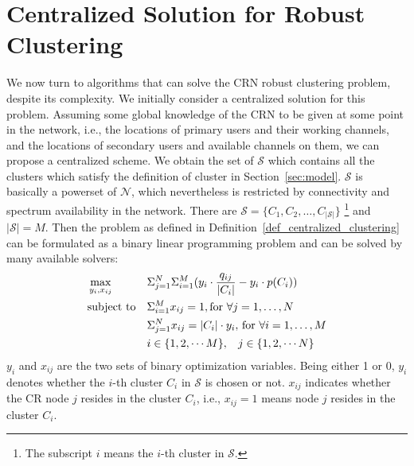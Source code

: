 \documentclass[times]{ettauth}
\newcommand{\ie}{i.e., }
\theoremstyle{mytheoremstyle}
\theoremstyle{mytheoremstyle}
\theoremstyle{mytheoremstyle}
\begin{document}
\section{Centralized Solution for Robust Clustering}
\label{centralized_solution}
We now turn to algorithms that can solve the CRN robust clustering problem, despite its complexity. 
We initially consider a centralized solution for this problem.
Assuming some global knowledge of the CRN to be given at some point in the network, \ie the locations of primary users and their working channels, and the locations of secondary users and available channels on them, we can propose a centralized scheme.
We obtain the set of $\mathcal{S}$ which contains all the clusters which satisfy the definition of cluster in Section~\ref{sec:model}.
$\mathcal{S}$ is basically a powerset of $\mathcal{N}$, which nevertheless is restricted by connectivity and spectrum availability in the network.
There are $\mathcal{S}=\{C_1, C_2, \ldots, C_{|\mathcal{S}|}\}$ \footnote{The subscript $i$ means the $i$-th cluster in $\mathcal{S}$.} and $|\mathcal{S}| = M$.
Then the problem as defined in Definition~\ref{def_centralized_clustering} can be formulated as a binary linear programming problem and can be solved by many available solvers:
\begin{equation}
\begin{aligned}
     &\max\limits_{y_i, x_{ij}} && \Sigma_{j=1}^N\Sigma_{i=1}^M (y_i\cdot \frac{q_{ij}}{|C_i|} - y_i\cdot p(C_i)) \\
     &\text{subject to}   && \Sigma_{i=1}^M x_{ij} = 1, \text{for}\,\,\forall j=1, \ldots, N \\
   &&& \Sigma_{j=1}^N x_{ij} = |C_i|\cdot y_i,\, \text{for}\,\,\forall i=1, \ldots, M \\
   &&& i\in \{1,2, \cdots M\}, \hspace{0.3cm} j\in \{1,2,\cdots N\}
\end{aligned}
\label{centralized_opt}
\end{equation}
$y_i$ and $x_{ij}$ are the two sets of binary optimization variables.
Being either 1 or 0, $y_i$ denotes whether the $i$-th cluster $C_i$ in $\mathcal{S}$ is chosen or not.
$x_{ij}$ indicates whether the CR node $j$ resides in the cluster $C_i$, \ie $x_{ij}=1$ means node $j$ resides in the cluster $C_i$.
\end{document}
